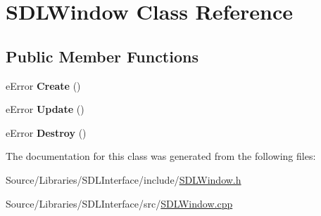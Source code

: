 \hypertarget{class_s_d_l_window}{\section{S\-D\-L\-Window Class Reference}
\label{class_s_d_l_window}
}
\subsection*{Public Member Functions}
\begin{DoxyCompactItemize}
\item 
\hypertarget{class_s_d_l_window_a745cd15bec2ad99813fb082f67896488}{e\-Error {\bfseries Create} ()}\label{class_s_d_l_window_a745cd15bec2ad99813fb082f67896488}

\item 
\hypertarget{class_s_d_l_window_a48f1ae5f9326fa006e8df73d4d0bd85f}{e\-Error {\bfseries Update} ()}\label{class_s_d_l_window_a48f1ae5f9326fa006e8df73d4d0bd85f}

\item 
\hypertarget{class_s_d_l_window_ab693926c16954fb9b6ec5cb0711ac117}{e\-Error {\bfseries Destroy} ()}\label{class_s_d_l_window_ab693926c16954fb9b6ec5cb0711ac117}

\end{DoxyCompactItemize}


The documentation for this class was generated from the following files\-:\begin{DoxyCompactItemize}
\item 
Source/\-Libraries/\-S\-D\-L\-Interface/include/\hyperlink{_s_d_l_window_8h}{S\-D\-L\-Window.\-h}\item 
Source/\-Libraries/\-S\-D\-L\-Interface/src/\hyperlink{_s_d_l_window_8cpp}{S\-D\-L\-Window.\-cpp}\end{DoxyCompactItemize}
